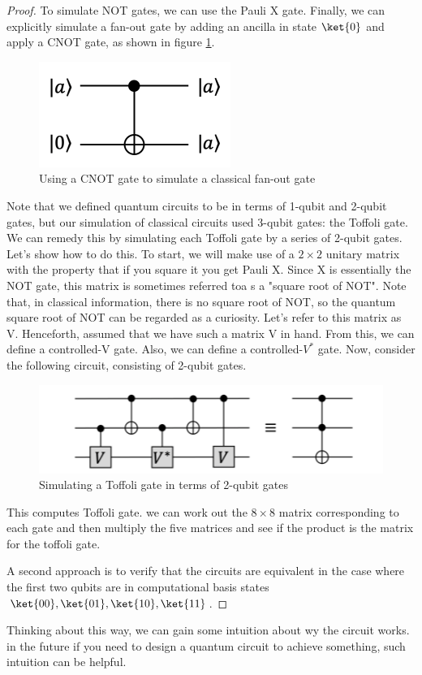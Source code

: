 \documentclass[12pt, oneside]{book}
\theoremstyle{definition}
\theoremstyle{definition}
\theoremstyle{remark}
\begin{document}
\begin{proof}
    To simulate NOT gates, we can use the Pauli X gate.
    Finally, we can explicitly simulate a fan-out gate by adding an ancilla in state $\ket{0}$ and apply a CNOT gate, as shown in figure \ref{fig:CNOT_fanout}.
    \begin{figure}[H]
        \centering
        \includegraphics[width=0.3\linewidth]{../images/CNOT_fanout.png}
        \caption{Using a CNOT gate to simulate a classical fan-out gate}
        \label{fig:CNOT_fanout}
    \end{figure}
    Note that we defined quantum circuits to be in terms of 1-qubit and 2-qubit gates, but our simulation of classical circuits used 3-qubit gates: the Toffoli gate. We can remedy this by simulating each Toffoli gate by a series of 2-qubit gates. Let's  show how to do this. To start, we will make use of a $2\times 2$ unitary matrix with the property that if you square it you get Pauli X. Since X is essentially the NOT gate, this matrix is sometimes referred toa s a "square root of NOT". Note that, in classical information, there is no square root of NOT, so the quantum square root of NOT can be regarded as a curiosity. Let's refer to this matrix as V. Henceforth, assumed that we have such a matrix V in hand. From this, we can define a controlled-V gate. Also, we can define a controlled-$V^*$ gate. Now, consider the following circuit, consisting of 2-qubit gates.
    \begin{figure}[H]
        \centering
        \includegraphics[width=0.75\linewidth]{../images/squarerootx.png}
        \caption{Simulating a Toffoli gate in terms of 2-qubit gates}
        \label{fig:toffoli_2-qubit}
    \end{figure}
    This computes Toffoli gate.
    we can work out the $ 8 \times 8$ matrix corresponding to each gate and then multiply the five matrices and see if the product is the matrix for the toffoli gate.

    A second approach is to verify that the circuits are equivalent in the case where the first two qubits are in computational basis states $\ket{00},\ket{01},\ket{10},\ket{11}$. 
\end{proof}
Thinking about this way, we can gain some intuition about wy the circuit works. in the future if you need to design a quantum circuit to achieve something, such intuition can be helpful. 
\end{document}
